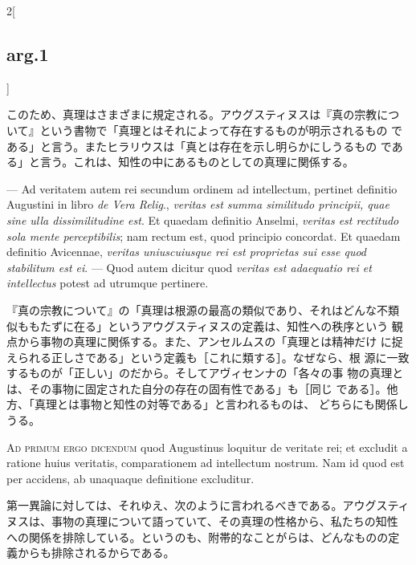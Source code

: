 \documentclass[paper=a4paper,fontsize=10pt,jafontsize=9pt,titlepage]{jlreq}
\begin{document}
\begin{paracol}{2}[\subsection{arg.1}]
\switchcolumn

このため、真理はさまざまに規定される。アウグスティヌスは『真の宗教につ
 いて』という書物で「真理とはそれによって存在するものが明示されるもの
 である」と言う。またヒラリウスは「真とは存在を示し明らかにしうるもの
 である」と言う。これは、知性の中にあるものとしての真理に関係する。

\switchcolumn*


--- Ad veritatem autem rei secundum ordinem ad intellectum, pertinet
definitio Augustini in libro {\itshape de Vera Relig}., {\itshape
veritas est summa similitudo principii, quae sine ulla dissimilitudine
est}. Et quaedam definitio Anselmi, {\itshape veritas est rectitudo sola
mente perceptibilis}; nam rectum est, quod principio concordat. Et
quaedam definitio Avicennae, {\itshape veritas uniuscuiusque rei est
proprietas sui esse quod stabilitum est ei}. --- Quod autem dicitur quod
{\itshape veritas est adaequatio rei et intellectus} potest ad utrumque
pertinere.

\switchcolumn

『真の宗教について』の「真理は根源の最高の類似であり、それはどんな不類
 似ももたずに在る」というアウグスティヌスの定義は、知性への秩序という
 観点から事物の真理に関係する。また、アンセルムスの「真理とは精神だけ
 に捉えられる正しさである」という定義も［これに類する］。なぜなら、根
 源に一致するものが「正しい」のだから。そしてアヴィセンナの「各々の事
 物の真理とは、その事物に固定された自分の存在の固有性である」も［同じ
 である］。他方、「真理とは事物と知性の対等である」と言われるものは、
 どちらにも関係しうる。

\switchcolumn*[\subsection{ad.1}]


{\scshape Ad primum ergo dicendum} quod Augustinus loquitur de
veritate rei; et excludit a ratione huius veritatis, comparationem ad
intellectum nostrum. Nam id quod est per accidens, ab unaquaque
definitione excluditur.

\switchcolumn

第一異論に対しては、それゆえ、次のように言われるべきである。アウグスティ
ヌスは、事物の真理について語っていて、その真理の性格から、私たちの知性
への関係を排除している。というのも、附帯的なことがらは、どんなものの定
義からも排除されるからである。

\switchcolumn*[\subsection{ad.2}]



\end{paracol}
\end{document}
